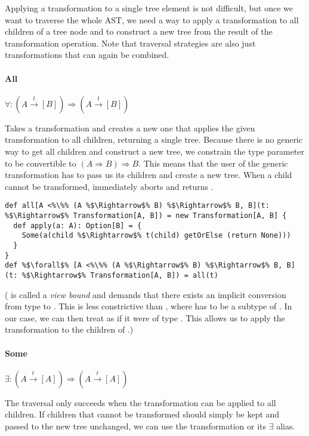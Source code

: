 \documentclass[10pt,a4paper,oneside]{scrreprt}
\begin{document}
Applying a transformation to a single tree element is not difficult, but once we want to traverse the whole AST, we need a way to apply a transformation to all children of a tree node and to construct a new tree from the result of the transformation operation. Note that traversal strategies are also just transformations that can again be combined.

\paragraph{All} \hfill  $\forall: (A \overset{t}{\rightarrow} [B]) \Rightarrow (A \overset{t}{\rightarrow} [B])$

\vspace{7pt} Takes a transformation and creates a new one that applies the given transformation to all children, returning a single tree. Because there is no generic way to get all children and construct a new tree, we constrain the type parameter  to be convertible to $(A \Rightarrow B) \Rightarrow B$. This means that the user of the generic transformation has to pass us its children and create a new tree. When a child cannot be transformed,  immediately aborts and returns .

\begin{lstlisting}
def all[A <%\%% (A %$\Rightarrow$% B) %$\Rightarrow$% B, B](t: %$\Rightarrow$% Transformation[A, B]) = new Transformation[A, B] {
  def apply(a: A): Option[B] = {
    Some(a(child %$\Rightarrow$% t(child) getOrElse (return None)))
  }
}
def %$\forall$% [A <%\%% (A %$\Rightarrow$% B) %$\Rightarrow$% B, B](t: %$\Rightarrow$% Transformation[A, B]) = all(t)
\end{lstlisting}

( is called a \textit{view bound} and demands that there exists an implicit conversion from type  to . This is less constrictive than , where  has to be a subtype of . In our case, we can then treat  as if it were of type . This allows us to apply the transformation to the children of .)

\paragraph{Some} \hfill $\exists: (A \overset{t}{\rightarrow} [A]) \Rightarrow (A \overset{t}{\rightarrow} [A])$

\vspace{7pt} The  traversal only succeeds when the transformation can be applied to all children. If children that cannot be transformed should simply be kept and passed to the new tree unchanged, we can use the  transformation or its $\exists$ alias.
\end{document}
